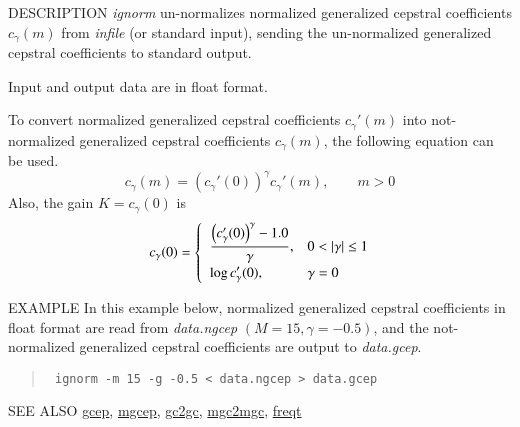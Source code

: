 \begin{qsection}{DESCRIPTION}
{\em ignorm} un-normalizes normalized generalized cepstral coefficients
$c_\gamma(m)$ from {\em infile} (or standard input), 
sending the un-normalized generalized cepstral coefficients 
to standard output.

Input and output data are in float format.

To convert normalized generalized cepstral coefficients
$c_\gamma'(m)$ into not-normalized generalized cepstral coefficients
$c_\gamma(m)$, the following equation can be used.
\begin{displaymath}
c_\gamma(m) = \left( c_\gamma'(0) \right)^{\gamma} c_\gamma'(m), \qquad m>0
\end{displaymath}
Also, the gain $K = c_\gamma(0)$ is
\begin{displaymath}
c_\gamma(0) = \begin{cases} \;\; \displaystyle
	  \frac{\Bigl(c_\gamma'(0)\Bigr)^{\gamma} - 1.0}{\gamma},
		& 0<|\gamma|\leq 1 \\ \;\; \displaystyle
	  \log c_\gamma'(0),  & \gamma=0
	\end{cases}
\end{displaymath}
\end{qsection}

\begin{options}
\end{options}

\begin{qsection}{EXAMPLE}
In this example below,
normalized generalized cepstral coefficients in
float format are read from {\em data.ngcep} $(M=15, \gamma=-0.5)$,
and the not-normalized generalized cepstral coefficients
are output to {\em data.gcep}.
\begin{quote}
 \verb! ignorm -m 15 -g -0.5 < data.ngcep > data.gcep!
\end{quote} 
\end{qsection}

\begin{qsection}{SEE ALSO}
\hyperlink{gcep}{gcep},
\hyperlink{mgcep}{mgcep},
\hyperlink{gc2gc}{gc2gc},
\hyperlink{mgc2mgc}{mgc2mgc},
\hyperlink{freqt}{freqt}
\end{qsection}
